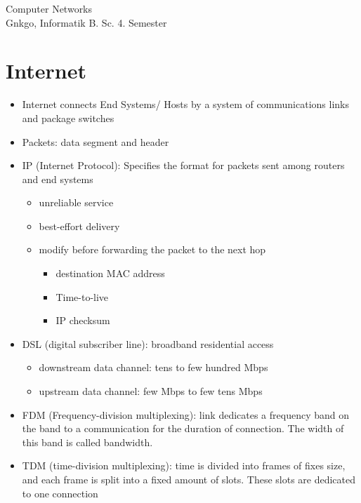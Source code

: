 \documentclass{article}
\begin{document}
\begin{titlepage}
    \thispagestyle{fancy}
    \renewcommand{\headrulewidth}{1pt}

    \center
    \vspace*{1.0cm}
    \Large Computer Networks \\[.5 cm]
    \large
    \normalsize
    Gnkgo, Informatik B. Sc. 4. Semester \\
    \vfill
\end{titlepage}

\tableofcontents
\newpage %

\section{Internet}

\begin{itemize}
    \item Internet connects End Systems/ Hosts by a system of communications links and package switches
    \item Packets: data segment and header
    \item IP (Internet Protocol): Specifies the format for packets sent among routers and end systems
    \begin{itemize}
        \item unreliable service
        \item best-effort delivery
        \item modify before forwarding the packet to the next hop
        \begin{itemize}
            \item destination MAC address
            \item Time-to-live
            \item IP checksum
        \end{itemize}
    \end{itemize}
    \item DSL (digital subscriber line): broadband residential access
    \begin{itemize}
        \item downstream data channel: tens to few hundred Mbps
        \item upstream data channel: few Mbps to few tens Mbps
    \end{itemize}
    \item FDM (Frequency-division multiplexing): link dedicates a frequency band on the band to a communication for the duration of connection. The width of this band is called bandwidth.
    \item TDM (time-division multiplexing): time is divided into frames of fixes size, and each frame is split into a fixed amount of slots. These slots are dedicated to one connection
\end{itemize}
\end{document}
